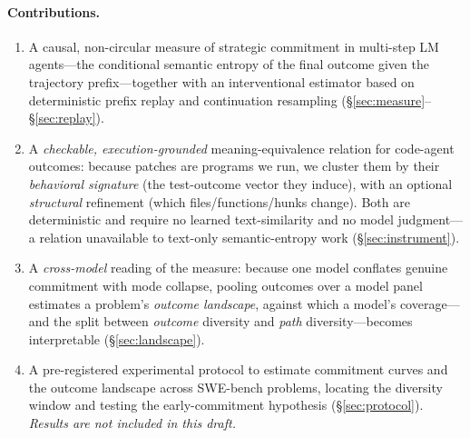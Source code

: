 \documentclass[11pt]{article}
\begin{document}
\paragraph{Contributions.}
\begin{enumerate}[leftmargin=1.4em,itemsep=2pt,topsep=2pt]
\item A causal, non-circular measure of strategic commitment in multi-step LM
agents---the conditional semantic entropy of the final outcome given the
trajectory prefix---together with an interventional estimator based on
deterministic prefix replay and continuation resampling
(\S\ref{sec:measure}--\S\ref{sec:replay}).
\item A \emph{checkable, execution-grounded} meaning-equivalence relation for
code-agent outcomes: because patches are programs we run, we cluster them by their
\emph{behavioral signature} (the test-outcome vector they induce), with an optional
\emph{structural} refinement (which files/functions/hunks change). Both are
deterministic and require no learned text-similarity and no model judgment---a
relation unavailable to text-only semantic-entropy work (\S\ref{sec:instrument}).
\item A \emph{cross-model} reading of the measure: because one model conflates
genuine commitment with mode collapse, pooling outcomes over a model panel
estimates a problem's \emph{outcome landscape}, against which a model's
coverage---and the split between \emph{outcome} diversity and \emph{path}
diversity---becomes interpretable (\S\ref{sec:landscape}).
\item A pre-registered experimental protocol to estimate commitment curves and the
outcome landscape across SWE-bench problems, locating the diversity window and
testing the early-commitment hypothesis (\S\ref{sec:protocol}). \emph{Results are
not included in this draft.}
\end{enumerate}
\end{document}
